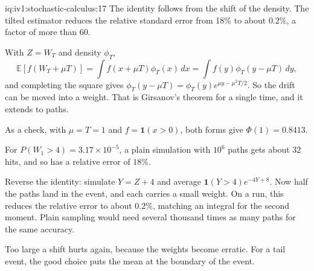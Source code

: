 \begin{solution}{iq:iv1:stochastic-calculus:17}
The identity follows from the shift of the density. The tilted estimator reduces the relative standard error from 18\% to about $0.2\%$, a factor of more than 60.

With $Z = W_T$ and density $\phi_T$,
\[
\mathbb{E}[f(W_T + \mu T)] = \int f(x + \mu T)\phi_T(x)\,dx = \int f(y)\phi_T(y - \mu T)\,dy,
\]
and completing the square gives $\phi_T(y - \mu T) = \phi_T(y)e^{\mu y - \mu^2T/2}$. So the drift can be moved into a weight. That is Girsanov's theorem for a single time, and it extends to paths.

As a check, with $\mu = T = 1$ and $f = \mathbf{1}(x > 0)$, both forms give $\Phi(1) = 0.8413$.

For $P(W_1 > 4) = 3.17 \times 10^{-5}$, a plain simulation with $10^6$ paths gets about 32 hits, and so has a relative error of $18\%$.

Reverse the identity: simulate $Y = Z + 4$ and average $\mathbf{1}(Y > 4)e^{-4Y + 8}$. Now half the paths land in the event, and each carries a small weight. On a run, this reduces the relative error to about $0.2\%$, matching an integral for the second moment. Plain sampling would need several thousand times as many paths for the same accuracy.

Too large a shift hurts again, because the weights become erratic. For a tail event, the good choice puts the mean at the boundary of the event.



\end{solution}

